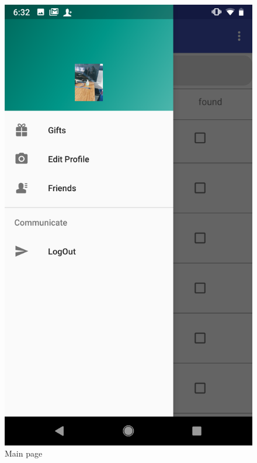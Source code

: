 \begin{figure}[htb]
\begin{minipage}[t]{0.5\textwidth}
\includegraphics[width=.95\textwidth]{section03/assets/MainPortrait.png}
\subcaption{}
\end{minipage}%
\caption[Short Caption 2]{\label{MainPageUI}Main page}
\end{figure}

